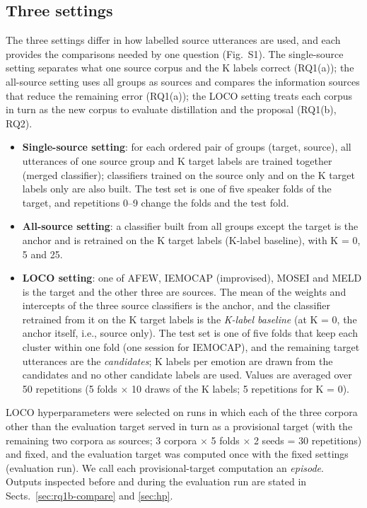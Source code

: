 \subsection{Three settings}\label{sec:settings}
The three settings differ in how labelled source utterances are used, and each provides the comparisons needed by one question (Fig.~S1). The single-source setting separates what one source corpus and the K labels correct (RQ1(a)); the all-source setting uses all groups as sources and compares the information sources that reduce the remaining error (RQ1(a)); the LOCO setting treats each corpus in turn as the new corpus to evaluate distillation and the proposal (RQ1(b), RQ2).
\begin{itemize}
\item \textbf{Single-source setting}: for each ordered pair of groups (target, source), all utterances of one source group and K target labels are trained together (merged classifier); classifiers trained on the source only and on the K target labels only are also built. The test set is one of five speaker folds of the target, and repetitions 0--9 change the folds and the test fold.
\item \textbf{All-source setting}: a classifier built from all groups except the target is the anchor and is retrained on the K target labels (K-label baseline), with K = 0, 5 and 25.
\item \textbf{LOCO setting}: one of AFEW, IEMOCAP (improvised), MOSEI and MELD is the target and the other three are sources. The mean of the weights and intercepts of the three source classifiers is the anchor, and the classifier retrained from it on the K target labels is the \emph{K-label baseline} (at K = 0, the anchor itself, i.e., source only). The test set is one of five folds that keep each cluster within one fold (one session for IEMOCAP), and the remaining target utterances are the \emph{candidates}; K labels per emotion are drawn from the candidates and no other candidate labels are used. Values are averaged over 50 repetitions (5 folds $\times$ 10 draws of the K labels; 5 repetitions for K = 0).
\end{itemize}

LOCO hyperparameters were selected on runs in which each of the three corpora other than the evaluation target served in turn as a provisional target (with the remaining two corpora as sources; 3 corpora $\times$ 5 folds $\times$ 2 seeds = 30 repetitions) and fixed, and the evaluation target was computed once with the fixed settings (evaluation run). We call each provisional-target computation an \emph{episode}. Outputs inspected before and during the evaluation run are stated in Sects.~\ref{sec:rq1b-compare} and \ref{sec:hp}.

